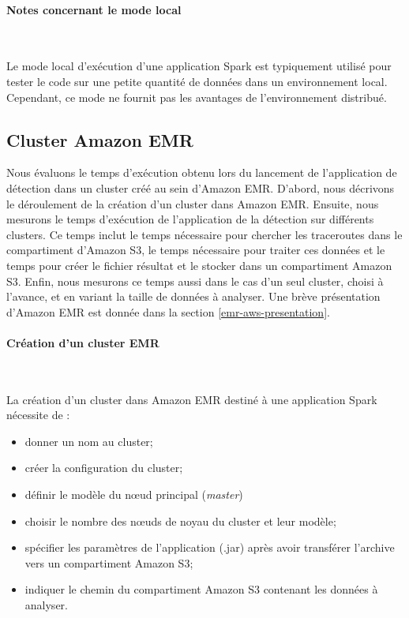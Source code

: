 \paragraph{Notes concernant le mode local}~

Le mode local d'exécution d'une application Spark est typiquement utilisé pour tester le code sur une petite quantité de données dans un environnement local. Cependant, ce mode  ne fournit pas les avantages de l'environnement distribué. 

\subsection{Cluster Amazon EMR}

Nous évaluons le temps d'exécution obtenu lors du lancement de l'application de détection dans un cluster créé au sein d'Amazon EMR. D'abord, nous  décrivons le déroulement de la création d'un cluster dans Amazon EMR. Ensuite, nous mesurons le temps d'exécution de l'application de la détection sur différents clusters. Ce temps inclut le temps nécessaire  pour chercher les traceroutes dans le compartiment d'Amazon S3, le temps nécessaire pour traiter ces données et  le temps pour créer le fichier résultat et le stocker dans un compartiment Amazon S3. Enfin, nous mesurons ce temps  aussi dans le cas d'un seul cluster, choisi à l'avance, et en variant la taille  de données à analyser. Une brève présentation d'Amazon EMR est donnée dans la section \ref{emr-aws-presentation}.

\paragraph{Création d'un cluster EMR}~

La création d'un cluster dans Amazon EMR destiné à une application Spark nécessite de  :
\begin{itemize}
	\item donner un nom au cluster;
	\item créer la configuration du cluster;
	\item définir le modèle du n\oe{}ud principal (\textit{master}) 
	\item choisir le nombre des n\oe{}uds de noyau  du cluster et leur modèle;
	\item spécifier les paramètres de l'application  (.jar) après avoir transférer l'archive vers  un compartiment Amazon S3;
	\item indiquer le chemin du compartiment Amazon S3 contenant  les données à analyser.
\end{itemize}

